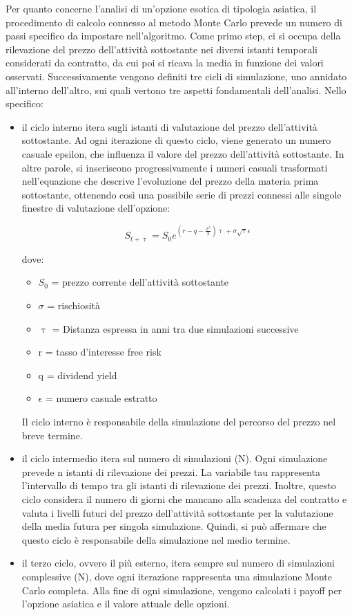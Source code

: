\documentclass[12pt,a4paper]{report}
\begin{document}
Per quanto concerne l'analisi di un'opzione esotica di tipologia asiatica, il procedimento di calcolo connesso al metodo Monte Carlo prevede un numero di passi specifico da impostare nell'algoritmo. Come primo step, ci si occupa della rilevazione del prezzo dell'attività sottostante nei diversi istanti temporali considerati da contratto, da cui poi si ricava la media in funzione dei valori osservati. Successivamente vengono definiti tre cicli di simulazione, uno annidato all'interno dell'altro, sui quali vertono tre aspetti fondamentali dell'analisi. Nello specifico:
\begin{itemize}
    \item il ciclo interno itera sugli istanti di valutazione del prezzo dell'attività sottostante. Ad ogni iterazione di questo ciclo, viene generato un numero casuale epsilon, che influenza il valore del prezzo dell'attività sottostante. In altre parole, si inseriscono progressivamente i numeri casuali trasformati nell'equazione che descrive l'evoluzione del prezzo della materia prima sottostante, ottenendo così una possibile serie di prezzi connessi alle singole finestre di valutazione dell'opzione:

\begin{equation}\label{eq:Prezzo MC}
    S_{t+\uptau} = S_0 e^{(r-q-\frac{\sigma^2}{2})\uptau+\sigma\sqrt{\uptau}\epsilon}
\end{equation}

dove:

\begin{itemize}
    \item $S_0$ = prezzo corrente dell'attività sottostante
    \item $\sigma$ = rischiosità
    \item $\uptau$ = Distanza espressa in anni tra due simulazioni successive
    \item r = tasso d'interesse free risk
    \item q = dividend yield
    \item $\epsilon$ = numero casuale estratto
\end{itemize}

Il ciclo interno è responsabile della simulazione del percorso del prezzo nel breve termine.

    \item il ciclo intermedio itera sul numero di simulazioni (N). Ogni simulazione prevede n istanti di rilevazione dei prezzi. La variabile tau rappresenta l'intervallo di tempo tra gli istanti di rilevazione dei prezzi. Inoltre, questo ciclo considera il numero di giorni che mancano alla scadenza del contratto e valuta i livelli futuri del prezzo dell'attività sottostante per la valutazione della media futura per singola simulazione. Quindi, si può affermare che questo ciclo è responsabile della simulazione nel medio termine.
    \item il terzo ciclo, ovvero il più esterno, itera sempre sul numero di simulazioni complessive (N), dove ogni iterazione rappresenta una simulazione Monte Carlo completa. Alla fine di ogni simulazione, vengono calcolati i payoff per l'opzione asiatica e il valore attuale delle opzioni.
\end{itemize}
\end{document}
